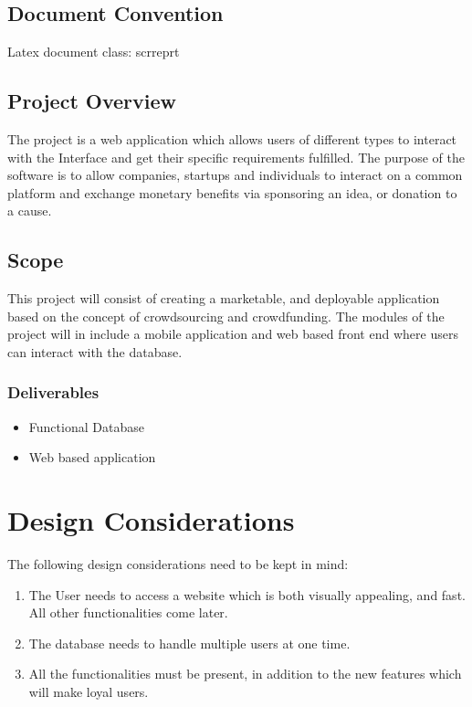 \documentclass{scrreprt}
\begin{document}
\section{Document Convention}
Latex document class: scrreprt

\section{Project Overview}
The project is a web application which allows users of different types to interact with the Interface and get their specific requirements fulfilled. The purpose of the software is to allow companies, startups and individuals to interact on a common platform and exchange monetary benefits via sponsoring an idea, or donation to a cause. 

\section{Scope}
This project will consist of creating a marketable, and deployable application based on the concept of crowdsourcing and crowdfunding. The modules of the project will in include a mobile application and web based front end where users can interact with the database.
\subsection{Deliverables}
\begin{itemize}
  \item Functional Database
  \item Web based application
\end{itemize}

\chapter{Design Considerations}
The following design considerations need to be kept in mind:

\begin{enumerate}
  \item The User needs to access a website which is both visually appealing, and fast. All other functionalities come later.
  \item The database needs to handle multiple users at one time.
  \item All the functionalities must be present, in addition to the new features which will make loyal users.
\end{enumerate}
\end{document}
